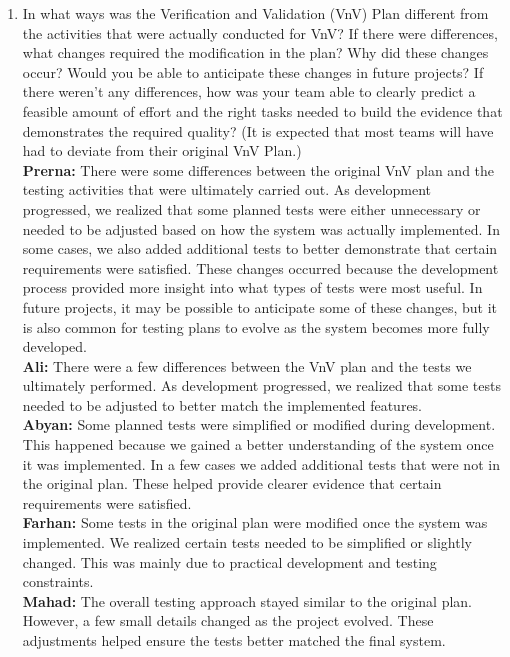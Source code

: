 \documentclass[12pt, titlepage]{article}
\begin{document}
\begin{enumerate}
They helped us think about how someone would interact with the system.
The more technical testing details came from our development process. \\
  \textbf{Mahad:} Feedback from peers helped us refine the way we explained certain testing approaches.
They provided helpful perspectives on usability and system behaviour.
Most of the detailed test procedures were still created by our team. \\
  \item In what ways was the Verification and Validation (VnV) Plan different
  from the activities that were actually conducted for VnV?  If there were
  differences, what changes required the modification in the plan?  Why did
  these changes occur?  Would you be able to anticipate these changes in future
  projects?  If there weren't any differences, how was your team able to clearly
  predict a feasible amount of effort and the right tasks needed to build the
  evidence that demonstrates the required quality?  (It is expected that most
  teams will have had to deviate from their original VnV Plan.)\\
  \textbf{Prerna:} There were some differences between the original VnV plan and the testing activities that were ultimately carried out. As development progressed, we realized that some planned tests were either unnecessary or needed to be adjusted based on how the system was actually implemented. In some cases, we also added additional tests to better demonstrate that certain requirements were satisfied. These changes occurred because the development process provided more insight into what types of tests were most useful. In future projects, it may be possible to anticipate some of these changes, but it is also common for testing plans to evolve as the system becomes more fully developed.\\
  \textbf{Ali:} There were a few differences between the VnV plan and the tests we ultimately performed. As development progressed, we realized that some tests needed to be adjusted to better match the implemented features. \\
  \textbf{Abyan:} Some planned tests were simplified or modified during development. This happened because we gained a better understanding of the system once it was implemented. In a few cases we added additional tests that were not in the original plan. These helped provide clearer evidence that certain requirements were satisfied.\\
  \textbf{Farhan:} Some tests in the original plan were modified once the system was implemented.
We realized certain tests needed to be simplified or slightly changed.
This was mainly due to practical development and testing constraints. \\
  \textbf{Mahad:} The overall testing approach stayed similar to the original plan.
However, a few small details changed as the project evolved.
These adjustments helped ensure the tests better matched the final system.\\
\end{enumerate}
\end{document}
